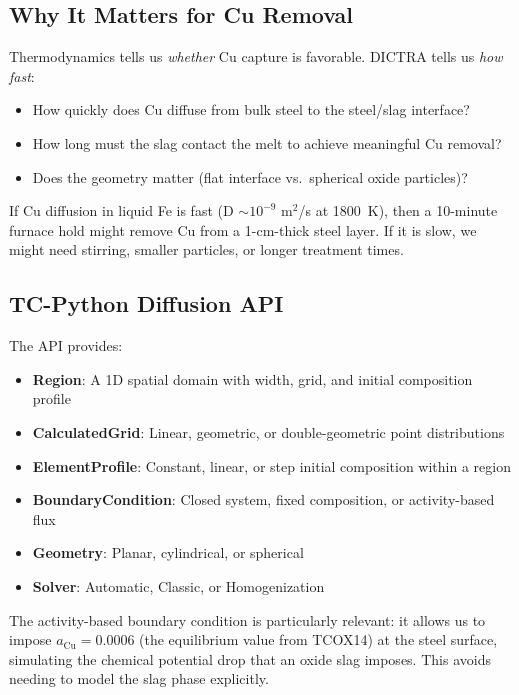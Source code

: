 \documentclass[11pt]{article}
\begin{document}
\subsection{Why It Matters for Cu Removal}

Thermodynamics tells us \textit{whether} Cu capture is favorable. DICTRA tells us \textit{how fast}:
\begin{itemize}[leftmargin=*]
    \item How quickly does Cu diffuse from bulk steel to the steel/slag interface?
    \item How long must the slag contact the melt to achieve meaningful Cu removal?
    \item Does the geometry matter (flat interface vs.\ spherical oxide particles)?
\end{itemize}

If Cu diffusion in liquid Fe is fast (D $\sim 10^{-9}$ m$^2$/s at \SI{1800}{\kelvin}), then a 10-minute furnace hold might remove Cu from a 1-cm-thick steel layer. If it is slow, we might need stirring, smaller particles, or longer treatment times.

\subsection{TC-Python Diffusion API}

The API provides:
\begin{itemize}[leftmargin=*]
    \item \textbf{Region}: A 1D spatial domain with width, grid, and initial composition profile
    \item \textbf{CalculatedGrid}: Linear, geometric, or double-geometric point distributions
    \item \textbf{ElementProfile}: Constant, linear, or step initial composition within a region
    \item \textbf{BoundaryCondition}: Closed system, fixed composition, or activity-based flux
    \item \textbf{Geometry}: Planar, cylindrical, or spherical
    \item \textbf{Solver}: Automatic, Classic, or Homogenization
\end{itemize}

The activity-based boundary condition is particularly relevant: it allows us to impose $a_{\text{Cu}} = 0.0006$ (the equilibrium value from TCOX14) at the steel surface, simulating the chemical potential drop that an oxide slag imposes. This avoids needing to model the slag phase explicitly.
\end{document}
